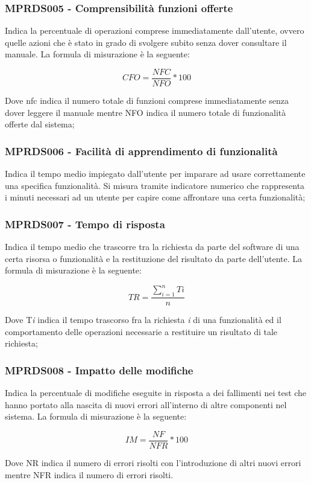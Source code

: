 {\subsubsection{MPRDS005 - Comprensibilità funzioni offerte}
Indica la percentuale di operazioni comprese immediatamente dall'utente, ovvero quelle azioni che è stato in grado di svolgere subito senza dover consultare il manuale. La formula di misurazione è la seguente:
\begin{center}
    \begin{displaymath}
        CFO = \frac{NFC}{NFO} * 100
    \end{displaymath}
\end{center}
Dove nfc indica il numero totale di funzioni comprese immediatamente senza dover leggere il manuale mentre NFO indica il numero totale di funzionalità offerte dal sistema;
\subsubsection{MPRDS006 - Facilità di apprendimento di funzionalità}
Indica il tempo medio impiegato dall'utente per imparare ad usare correttamente una specifica funzionalità. Si misura tramite indicatore numerico che rappresenta i minuti necessari ad un utente per capire come affrontare una certa funzionalità;
\subsubsection{MPRDS007 - Tempo di risposta}
Indica il tempo medio che trascorre tra la richiesta da parte del software di una certa risorsa o funzionalità e la restituzione del risultato da parte dell'utente. La formula di misurazione è la seguente:
\begin{center}
    \begin{displaymath}
        TR = \frac{\sum\limits_{i=1}^n Ti}{n}
    \end{displaymath}
\end{center}
Dove T\textit{i} indica il tempo trascorso fra la richiesta \textit{i} di una funzionalità ed il comportamento delle operazioni necessarie a restituire un risultato di tale richiesta;
\subsubsection{MPRDS008 - Impatto delle modifiche}
Indica la percentuale di modifiche eseguite in risposta a dei fallimenti nei test che hanno portato alla nascita di nuovi errori all'interno di altre componenti nel sistema. La formula di misurazione è la seguente:
\begin{center}
    \begin{displaymath}
        IM = \frac{NF}{NFR} * 100
    \end{displaymath}
\end{center}
Dove NR indica il numero di errori risolti con l'introduzione di altri nuovi errori mentre NFR indica il numero di errori risolti.
}
